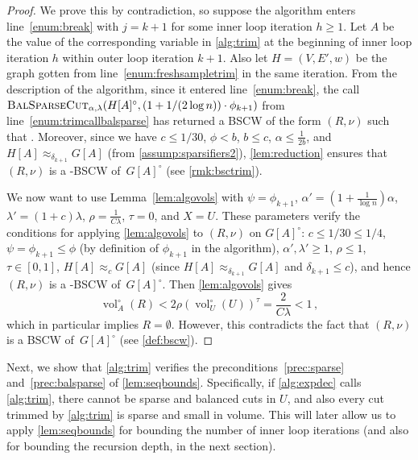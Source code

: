 \documentclass[epsfig,letter,11pt]{article}
\numberwithin{equation}{section}
\newcommand{\unvolc}[2]{\operatorname{vol}_{#2}^\circ (#1)}
\newcommand{\wvolc}[2]{\operatorname{vol}_{#2}^{\circ \,w} (#1)}
\newcommand{\bsc}{\textsc{BalSparseCut}_{\alpha,\lambda}}
\begin{document}
\begin{proof}
	We prove this by contradiction, so suppose the algorithm enters line~\eqref{enum:break} with $j=k+1$ for some inner loop iteration $h \ge 1$. Let $A$ be the value of the corresponding variable in \cref{alg:trim} at the beginning of inner loop iteration $h$ within outer loop iteration $k+1$. Also let $H=(V,E',w)$ be the graph gotten from line~\eqref{enum:freshsampletrim} in the same iteration. From the description of the algorithm, since it entered line~\eqref{enum:break}, the call $\bsc(H[A]^\circ, (1+{1}/{(2\log n)}) \cdot \phi_{k+1})$ from line~\eqref{enum:trimcallbalsparse} has returned a BSCW of the form $(R,\nu)$ such that \smash{$\nu< \frac{1}{C\lambda}(\wvolc{U}{U})^{1-(k+1-1)/k}=\frac{1}{C\lambda}(\wvolc{U}{U})^0$}. Moreover, since we have $c \le 1/30$, $\phi < b$, $b \le c$, $\alpha \le \frac{1}{2b}$,  and $H[A] \approx_{\delta_{k+1}} G[A]$ (from \cref{assump:sparsifiers2}), \cref{lem:reduction} ensures that $(R,\nu)$ is a -BSCW of~$G[A]^\circ$ (see \cref{rmk:bsctrim}).
	
	We now want to use Lemma~\ref{lem:algovols} with $\psi = \phi_{k+1}$, $ \alpha'=(1+\frac{1}{\log n})\alpha$, $\lambda' =(1+c)\lambda$, $\rho= \frac{1}{C\lambda}$, $\tau=0$, and $X=U$. These parameters verify the conditions for applying \cref{lem:algovols} to $(R,\nu)$ on $G[A]^\circ$: $c \le 1/30 \le 1/4$, $\psi = \phi_{k+1} \le \phi$ (by definition of $\phi_{k+1}$ in the algorithm), $\alpha',\lambda' \ge 1$, $\rho \le 1$, $\tau \in [0,1]$, $H[A] \approx_{c} G[A]$ (since $H[A] \approx_{\delta_{k+1}} G[A]$ and $\delta_{k+1} \le c$), and  hence $(R,\nu)$ is a -BSCW of~$G[A]^\circ$. Then \cref{lem:algovols} gives
	\begin{equation*}
		\unvolc{R}{A} < 2 \rho (\unvolc{U}{U})^\tau = \frac{2}{C\lambda} < 1 \, ,
	\end{equation*}
	which in particular implies $R=\emptyset$. However, this contradicts the fact that $(R,\nu)$ is a BSCW of~$G[A]^\circ$ (see \cref{def:bscw}).
\end{proof}

\noindent
Next, we show that \cref{alg:trim} verifies the preconditions~\eqref{prec:sparse} and~\eqref{prec:balsparse} of \cref{lem:seqbounds}. Specifically, if \cref{alg:expdec} calls \cref{alg:trim}, there cannot be sparse and balanced cuts in $U$, and also every cut trimmed by \cref{alg:trim} is sparse and small in volume. This will later allow us to apply \cref{lem:seqbounds} for bounding the number of inner loop iterations (and also for bounding the recursion depth, in the next section).
\end{document}
